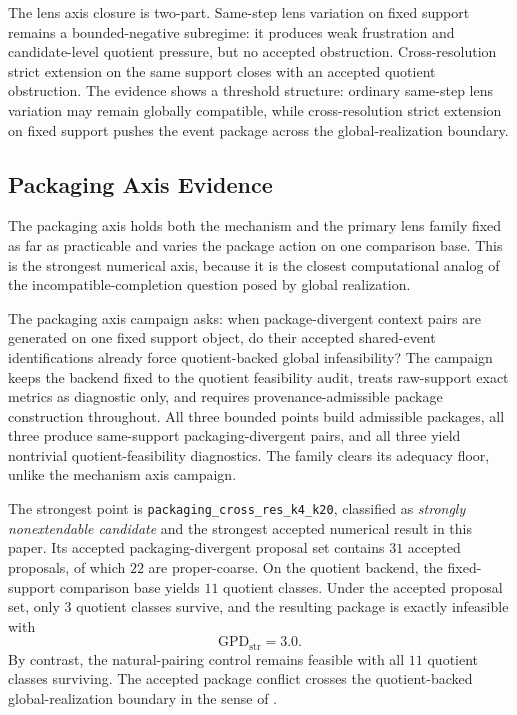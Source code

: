 \documentclass[11pt]{article}
\newcommand{\GPDstr}{\mathrm{GPD}_{\mathrm{str}}}
\theoremstyle{definition}
\begin{document}
The lens axis closure is two-part. Same-step lens variation on fixed support remains a bounded-negative subregime: it produces weak frustration and candidate-level quotient pressure, but no accepted obstruction. Cross-resolution strict extension on the same support closes with an accepted quotient obstruction. The evidence shows a threshold structure: ordinary same-step lens variation may remain globally compatible, while cross-resolution strict extension on fixed support pushes the event package across the global-realization boundary.

\subsection{Packaging Axis Evidence}\label{sec:discovery-packaging}

The packaging axis holds both the mechanism and the primary lens family fixed as far as practicable and varies the package action on one comparison base. This is the strongest numerical axis, because it is the closest computational analog of the incompatible-completion question posed by global realization.

The packaging axis campaign asks: when package-divergent context pairs are generated on one fixed support object, do their accepted shared-event identifications already force quotient-backed global infeasibility? The campaign keeps the backend fixed to the quotient feasibility audit, treats raw-support exact metrics as diagnostic only, and requires provenance-admissible package construction throughout. All three bounded points build admissible packages, all three produce same-support packaging-divergent pairs, and all three yield nontrivial quotient-feasibility diagnostics. The family clears its adequacy floor, unlike the mechanism axis campaign.

The strongest point is \texttt{packaging\_cross\_res\_k4\_k20}, classified as \emph{strongly nonextendable candidate} and the strongest accepted numerical result in this paper. Its accepted packaging-divergent proposal set contains \(31\) accepted proposals, of which \(22\) are proper-coarse. On the quotient backend, the fixed-support comparison base yields \(11\) quotient classes. Under the accepted proposal set, only \(3\) quotient classes survive, and the resulting package is exactly infeasible with
\[
\GPDstr = 3.0.
\]
By contrast, the natural-pairing control remains feasible with all \(11\) quotient classes surviving. The accepted package conflict crosses the quotient-backed global-realization boundary in the sense of .
\end{document}
